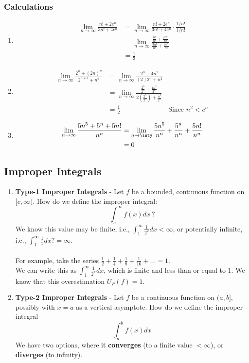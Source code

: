 \documentclass{article}
\begin{document}
\subsubsection{Calculations}
\begin{enumerate}
    \item \begin{align*}
        \lim_{n\to\infty} \frac{n! + 2e^n}{3n! + 4e^n} & =  \lim_{n\to\infty} \frac{n! + 2e^n}{3n! + 4e^n} \cdot \frac{1/n!}{1/n!}\\
        & = \lim_{n\to\infty} \frac{\frac{n!}{n!} + \frac{2e^n}{n!}}{\frac{3n!}{n!} + \frac{4e^n}{n!}}\\
        & = \frac{1}{3}
    \end{align*}
    
    \item \begin{align*}
        \lim_{n\to\infty} \frac{2^n + (2n)^n}{2^{n+1} + n^2} & = \lim_{n\to\infty} \frac{2^n + 4n^2}{(2)2^n + n^2}\\
        & = \lim_{n\to\infty} \frac{\frac{2^n}{2^n}  + \frac{4n^2}{2^n}}{2(\frac{2^n}{2^n}) + \frac{n^2}{2^n}}\\
        & = \frac{1}{2} & \text{Since }n^2 < c^n 
    \end{align*}
    
    \item \begin{align*}
        \lim_{n\to\infty} \frac{5n^5 + 5^n + 5n!}{n^n} & = \lim_{n\to\inty} \frac{5n^5}{n^n} + \frac{5^n}{n^n} + \frac{5n!}{n^n}\\
        & = 0
    \end{align*}
\end{enumerate}

\subsection{Improper Integrals}
\begin{enumerate}
    \item \textbf{Type-1 Improper Integrals} - Let $f$ be a bounded, continuous function on $[c,\infty)$. How do we define the improper integral:
    $$\int_c^\infty f(x) dx \ ?$$
    We know this value may be finite, i.e., $\int_1^\infty \frac{1}{2^x} dx < \infty$, or potentially infinite, i.e., $\int_1^\infty \frac{1}{x} dx ?= \infty$.\\
    \\
    For example, take the series $\frac{1}{2} + \frac{1}{4} + \frac{1}{8} + \frac{1}{16} + ... = 1$.\\
    We can write this as $\int_1^\infty \frac{1}{2^x} dx$, which is finite and less than or equal to 1. We know that this overestimation $U_P(f) = 1$.
    
    \item \textbf{Type-2 Improper Integrals} - Let $f$ be a continuous function on $(a,b]$, possibly with $x =a $ as a vertical asymptote. How do we define the improper integral
    $$\int_a^b f(x) dx$$
    We have two options, where it \textbf{converges} (to a finite value $< \infty$), or \textbf{diverges} (to infinity). 
\end{enumerate}
\end{document}
